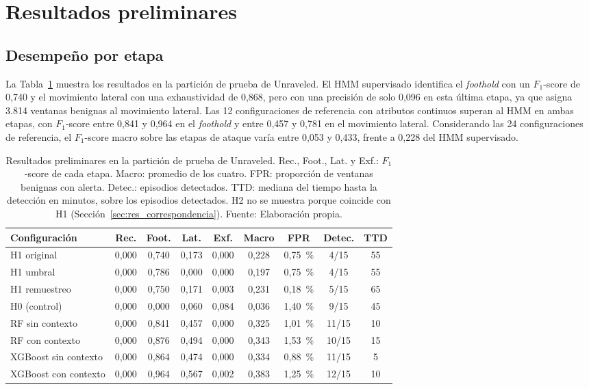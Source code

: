 \section{Resultados preliminares}
\label{sec:resultados_preliminares}

\subsection{Desempeño por etapa}
La Tabla~\ref{tab:res_unraveled} muestra los resultados en la partición de prueba de Unraveled. El HMM supervisado identifica el \textit{foothold} con un $F_1$-score de 0,740 y el movimiento lateral con una exhaustividad de 0,868, pero con una precisión de solo 0,096 en esta última etapa, ya que asigna 3.814 ventanas benignas al movimiento lateral. Las 12 configuraciones de referencia con atributos continuos superan al HMM en ambas etapas, con $F_1$-score entre 0,841 y 0,964 en el \textit{foothold} y entre 0,457 y 0,781 en el movimiento lateral. Considerando las 24 configuraciones de referencia, el $F_1$-score macro sobre las etapas de ataque varía entre 0,053 y 0,433, frente a 0,228 del HMM supervisado.

\begin{table}[h!]
\centering
\small
\renewcommand{\arraystretch}{1.25}
\begin{tabular}{|l|c|c|c|c|c|c|c|c|}
\hline
\textbf{Configuración} & \textbf{Rec.} & \textbf{Foot.} & \textbf{Lat.} & \textbf{Exf.} & \textbf{Macro} & \textbf{FPR} & \textbf{Detec.} & \textbf{TTD} \\ \hline
H1 original & 0,000 & 0,740 & 0,173 & 0,000 & 0,228 & 0,75~\% & 4/15 & 55 \\ \hline
H1 umbral & 0,000 & 0,786 & 0,000 & 0,000 & 0,197 & 0,75~\% & 4/15 & 55 \\ \hline
H1 remuestreo & 0,000 & 0,750 & 0,171 & 0,003 & 0,231 & 0,18~\% & 5/15 & 65 \\ \hline
H0 (control) & 0,000 & 0,000 & 0,060 & 0,084 & 0,036 & 1,40~\% & 9/15 & 45 \\ \hline
RF sin contexto & 0,000 & 0,841 & 0,457 & 0,000 & 0,325 & 1,01~\% & 11/15 & 10 \\ \hline
RF con contexto & 0,000 & 0,876 & 0,494 & 0,000 & 0,343 & 1,53~\% & 10/15 & 15 \\ \hline
XGBoost sin contexto & 0,000 & 0,864 & 0,474 & 0,000 & 0,334 & 0,88~\% & 11/15 & 5 \\ \hline
XGBoost con contexto & 0,000 & 0,964 & 0,567 & 0,002 & 0,383 & 1,25~\% & 12/15 & 10 \\ \hline
\end{tabular}
\caption[Resultados preliminares en la partición de prueba de Unraveled.]{Resultados preliminares en la partición de prueba de Unraveled. Rec., Foot., Lat. y Exf.: $F_1$-score de cada etapa. Macro: promedio de los cuatro. FPR: proporción de ventanas benignas con alerta. Detec.: episodios detectados. TTD: mediana del tiempo hasta la detección en minutos, sobre los episodios detectados. H2 no se muestra porque coincide con H1 (Sección~\ref{sec:res_correspondencia}). Fuente: Elaboración propia.}
\label{tab:res_unraveled}
\end{table}
\FloatBarrier

